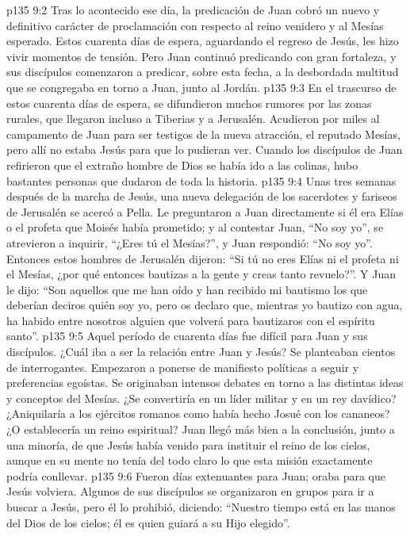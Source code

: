 \vs p135 9:2 \pc Tras lo acontecido ese día, la predicación de Juan cobró un nuevo y definitivo carácter de proclamación con respecto al reino venidero y al Mesías esperado. Estos cuarenta días de espera, aguardando el regreso de Jesús, les hizo vivir momentos de tensión. Pero Juan continuó predicando con gran fortaleza, y sus discípulos comenzaron a predicar, sobre esta fecha, a la desbordada multitud que se congregaba en torno a Juan, junto al Jordán.
\vs p135 9:3 En el trascurso de estos cuarenta días de espera, se difundieron muchos rumores por las zonas rurales, que llegaron incluso a Tiberias y a Jerusalén. Acudieron por miles al campamento de Juan para ser testigos de la nueva atracción, el reputado Mesías, pero allí no estaba Jesús para que lo pudieran ver. Cuando los discípulos de Juan refirieron que el extraño hombre de Dios se había ido a las colinas, hubo bastantes personas que dudaron de toda la historia.
\vs p135 9:4 Unas tres semanas después de la marcha de Jesús, una nueva delegación de los sacerdotes y fariseos de Jerusalén se acercó a Pella. Le preguntaron a Juan directamente si él era Elías o el profeta que Moisés había prometido; y al contestar Juan, “No soy yo”, se atrevieron a inquirir, “¿Eres tú el Mesías?”, y Juan respondió: “No soy yo”. Entonces estos hombres de Jerusalén dijeron: “Si tú no eres Elías ni el profeta ni el Mesías, ¿por qué entonces bautizas a la gente y creas tanto revuelo?”. Y Juan le dijo: “Son aquellos que me han oído y han recibido mi bautismo los que deberían deciros quién soy yo, pero os declaro que, mientras yo bautizo con agua, ha habido entre nosotros alguien que volverá para bautizaros con el espíritu santo”.
\vs p135 9:5 Aquel período de cuarenta días fue difícil para Juan y sus discípulos. ¿Cuál iba a ser la relación entre Juan y Jesús? Se planteaban cientos de interrogantes. Empezaron a ponerse de manifiesto políticas a seguir y preferencias egoístas. Se originaban intensos debates en torno a las distintas ideas y conceptos del Mesías. ¿Se convertiría en un líder militar y en un rey davídico? ¿Aniquilaría a los ejércitos romanos como había hecho Josué con los cananeos? ¿O establecería un reino espiritual? Juan llegó más bien a la conclusión, junto a una minoría, de que Jesús había venido para instituir el reino de los cielos, aunque en su mente no tenía del todo claro lo que esta misión exactamente podría conllevar.
\vs p135 9:6 Fueron días extenuantes para Juan; oraba para que Jesús volviera. Algunos de sus discípulos se organizaron en grupos para ir a buscar a Jesús, pero él lo prohibió, diciendo: “Nuestro tiempo está en las manos del Dios de los cielos; él es quien guiará a su Hijo elegido”.
